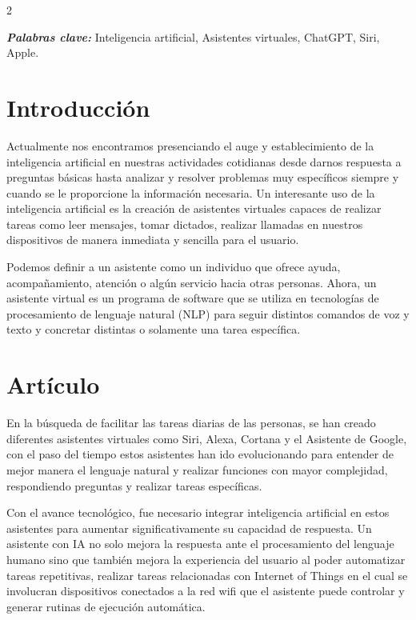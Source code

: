 \documentclass[12pt,spanish,Letterpaper,openany]{book}
\begin{document}
\begin {multicols}{2}

\textbf{\emph{Palabras clave:}} Inteligencia artificial, Asistentes virtuales, ChatGPT, Siri, Apple.

\hypertarget{introducciuxf3n-1}{%
\section{Introducción}\label{introducciuxf3n-1}}

Actualmente nos encontramos presenciando el auge y establecimiento de la inteligencia artificial en nuestras actividades cotidianas desde darnos respuesta a preguntas básicas hasta analizar y resolver problemas muy específicos siempre y cuando se le proporcione la información necesaria. Un interesante uso de la inteligencia artificial es la creación de asistentes virtuales capaces de realizar tareas como leer mensajes, tomar dictados, realizar llamadas en nuestros dispositivos de manera inmediata y sencilla para el usuario.

Podemos definir a un asistente como un individuo que ofrece ayuda, acompañamiento, atención o algún servicio hacia otras personas. Ahora, un asistente virtual es un programa de software que se utiliza en tecnologías de procesamiento de lenguaje natural (NLP) para seguir distintos comandos de voz y texto y concretar distintas o solamente una tarea específica.

\hypertarget{artuxedculo-1}{%
\section{Artículo}\label{artuxedculo-1}}

En la búsqueda de facilitar las tareas diarias de las personas, se han creado diferentes asistentes virtuales como Siri, Alexa, Cortana y el Asistente de Google, con el paso del tiempo estos asistentes han ido evolucionando para entender de mejor manera el lenguaje natural y realizar funciones con mayor complejidad, respondiendo preguntas y realizar tareas específicas.

Con el avance tecnológico, fue necesario integrar inteligencia artificial en estos asistentes para aumentar significativamente su capacidad de respuesta. Un asistente con IA no solo mejora la respuesta ante el procesamiento del lenguaje humano sino que también mejora la experiencia del usuario al poder automatizar tareas repetitivas, realizar tareas relacionadas con Internet of Things en el cual se involucran dispositivos conectados a la red wifi que el asistente puede controlar y generar rutinas de ejecución automática.


\end{multicols}
\end{document}
